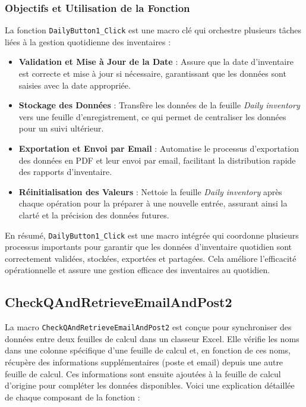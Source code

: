\documentclass[a4paper, oneside, 12pt, final]{extreport}
\begin{document}
\subsubsection{Objectifs et Utilisation de la Fonction}

La fonction \texttt{DailyButton1\_Click} est une macro clé qui orchestre plusieurs tâches liées à la gestion quotidienne des inventaires :

\begin{itemize}
    \item \textbf{Validation et Mise à Jour de la Date} : Assure que la date d'inventaire est correcte et mise à jour si nécessaire, garantissant que les données sont saisies avec la date appropriée.
    \item \textbf{Stockage des Données} : Transfère les données de la feuille \textit{Daily inventory} vers une feuille d'enregistrement, ce qui permet de centraliser les données pour un suivi ultérieur.
    \item \textbf{Exportation et Envoi par Email} : Automatise le processus d'exportation des données en PDF et leur envoi par email, facilitant la distribution rapide des rapports d'inventaire.
    \item \textbf{Réinitialisation des Valeurs} : Nettoie la feuille \textit{Daily inventory} après chaque opération pour la préparer à une nouvelle entrée, assurant ainsi la clarté et la précision des données futures.
\end{itemize}

En résumé, \texttt{DailyButton1\_Click} est une macro intégrée qui coordonne plusieurs processus importants pour garantir que les données d'inventaire quotidien sont correctement validées, stockées, exportées et partagées. Cela améliore l'efficacité opérationnelle et assure une gestion efficace des inventaires au quotidien.
\subsection{CheckQAndRetrieveEmailAndPost2}

La macro \texttt{CheckQAndRetrieveEmailAndPost2} est conçue pour synchroniser des données entre deux feuilles de calcul dans un classeur Excel. Elle vérifie les noms dans une colonne spécifique d'une feuille de calcul et, en fonction de ces noms, récupère des informations supplémentaires (poste et email) depuis une autre feuille de calcul. Ces informations sont ensuite ajoutées à la feuille de calcul d'origine pour compléter les données disponibles. Voici une explication détaillée de chaque composant de la fonction :
\end{document}
